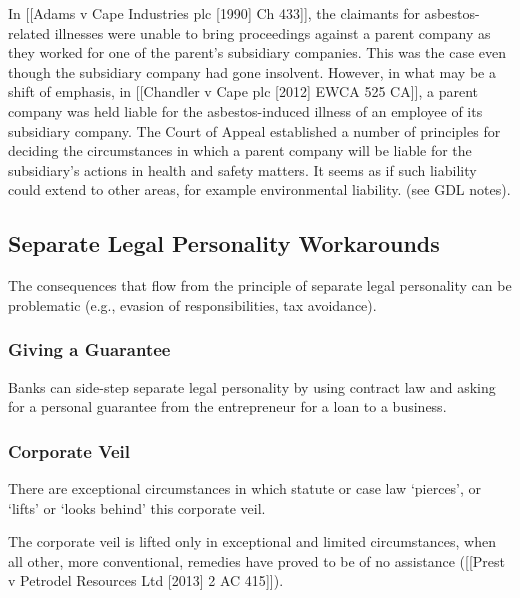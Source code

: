 \documentclass[
]{article}
\begin{document}
In {[}{[}Adams v Cape Industries plc {[}1990{]} Ch 433{]}{]}, the
claimants for asbestos-related illnesses were unable to bring
proceedings against a parent company as they worked for one of the
parent's subsidiary companies. This was the case even though the
subsidiary company had gone insolvent. However, in what may be a shift
of emphasis, in {[}{[}Chandler v Cape plc {[}2012{]} EWCA 525 CA{]}{]},
a parent company was held liable for the asbestos-induced illness of an
employee of its subsidiary company. The Court of Appeal established a
number of principles for deciding the circumstances in which a parent
company will be liable for the subsidiary's actions in health and safety
matters. It seems as if such liability could extend to other areas, for
example environmental liability. (see GDL notes).

\hypertarget{separate-legal-personality-workarounds}{%
\subsection{Separate Legal Personality
Workarounds}\label{separate-legal-personality-workarounds}}

The consequences that flow from the principle of separate legal
personality can be problematic (e.g., evasion of responsibilities, tax
avoidance).

\hypertarget{giving-a-guarantee}{%
\subsubsection{Giving a Guarantee}\label{giving-a-guarantee}}

Banks can side-step separate legal personality by using contract law and
asking for a personal guarantee from the entrepreneur for a loan to a
business.

\hypertarget{corporate-veil}{%
\subsubsection{Corporate Veil}\label{corporate-veil}}

There are exceptional circumstances in which statute or case law
`pierces', or `lifts' or `looks behind' this corporate veil.

The corporate veil is lifted only in exceptional and limited
circumstances, when all other, more conventional, remedies have proved
to be of no assistance ({[}{[}Prest v Petrodel Resources Ltd {[}2013{]}
2 AC 415{]}{]}).
\end{document}
